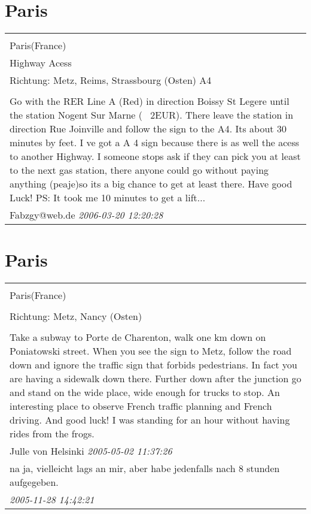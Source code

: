 \documentclass[a4paper,12pt]{article}
\begin{document}
\section{Paris}
\begin{tabular}{|p{13cm}|}
\hline\\
Paris(France)\\
Highway Acess\\
Richtung: Metz, Reims, Strassbourg (Osten) A4 \\
\hline\\
Go with the RER Line A (Red) in direction Boissy St Legere until
the station Nogent Sur Marne (~ 2EUR). There leave the station in direction
Rue Joinville and follow the sign to the A4. Its about 30 minutes by feet.
I ve got a A 4 sign because there is as well the acess to another Highway.
I someone stops ask if they can pick you at least to the next gas station, there
anyone could go without paying anything (peaje)so its a big chance to get at least there.
Have good Luck!
PS: It took me 10 minutes to get a lift... \\
Fabzgy@web.de \textit{ 2006-03-20 12:20:28 }\\\hline
\end{tabular}


\section{Paris}
\begin{tabular}{|p{13cm}|}
\hline\\
Paris(France)\\
\\
Richtung: Metz, Nancy (Osten) \\
\hline\\
Take a subway to Porte de Charenton, walk one km down on Poniatowski street. When you see the sign to Metz, follow the road down and ignore the traffic sign that forbids pedestrians. In fact you are having a sidewalk down there. Further down after the junction go and stand on the wide place, wide enough for trucks to stop. An interesting place to observe French traffic planning and French driving. And good luck! I was standing for an hour without having rides from the frogs. \\
Julle von Helsinki \textit{ 2005-05-02 11:37:26 }\\\hline na ja, vielleicht lags an mir, aber habe jedenfalls nach 8 stunden aufgegeben. \\
\textit{ 2005-11-28 14:42:21 }\\\hline
\end{tabular}
\end{document}
